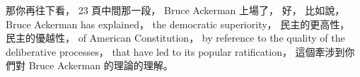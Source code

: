 \hypertarget{w02:cue:2047}{}那你再往下看，
\hypertarget{w02:cue:2048}{}23 頁中間那一段，
\hypertarget{w02:cue:2049}{}Bruce Ackerman 上場了，
\hypertarget{w02:cue:2050}{}好，
\hypertarget{w02:cue:2051}{}比如說，
\hypertarget{w02:cue:2052}{}Bruce Ackerman has explained，
\hypertarget{w02:cue:2053}{}the democratic superiority，
\hypertarget{w02:cue:2054}{}民主的更高性，
\hypertarget{w02:cue:2055}{}民主的優越性，
\hypertarget{w02:cue:2056}{}of American Constitution，
\hypertarget{w02:cue:2057}{}by reference to the quality of the deliberative processes，
\hypertarget{w02:cue:2058}{}that have led to its popular ratification，
\hypertarget{w02:cue:2059}{}這個牽涉到你們對 Bruce Ackerman 的理論的理解。


